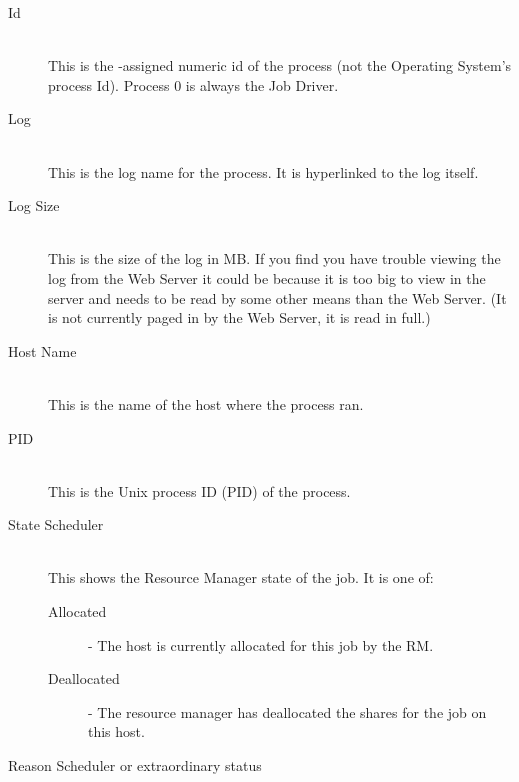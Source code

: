     \begin{description}

        \item[Id] \hfill \\
          This is the {\DUCC}-assigned numeric id of the process (not the Operating System's
          process Id). Process 0 is always the Job Driver.          

        \item[Log] \hfill \\
          This is the log name for the process. It is hyperlinked to the log itself.

        \item[Log Size] \hfill \\
          This is the size of the log in MB. If you find you have trouble viewing the log
          from the Web Server it could be because it is too big to view in the server and needs to
          be read by some other means than the Web Server.  (It is not currently paged in by 
          the Web Server, it is read in full.)

        \item[Host Name] \hfill \\
          This is the name of the host where the process ran.

        \item[PID] \hfill \\
          This is the Unix process ID (PID) of the process.

        \item[State Scheduler] \hfill \\

          This shows the Resource Manager state of the job. It is one of:
          \begin{description}
              \item[Allocated] - The host is currently allocated for this job by the RM.
              \item[Deallocated] - The resource manager has deallocated the shares for the job on
                this host.
          \end{description}

        \item[Reason Scheduler or extraordinary status] \hfill \\
          \label{itm:job-details-sched}



\end{description}

